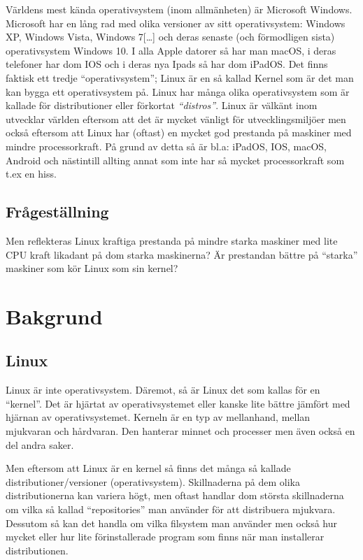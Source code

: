 \documentclass[12pt, a4paper]{report}
\begin{document}
   Världens mest kända operativsystem (inom allmänheten) är Microsoft Windows. Microsoft har en lång rad med olika versioner av sitt operativsystem\cite{windows}: Windows XP, Windows Vista, Windows 7[\dots] och deras senaste (och förmodligen sista) operativsystem Windows 10.
    I alla Apple datorer så har man macOS, i deras telefoner har dom IOS och i deras nya Ipads så har dom iPadOS.
    Det finns faktisk ett tredje ``operativsystem''; Linux är en så kallad Kernel \cite{redhat} som är det man kan bygga ett operativsystem på. Linux har många olika operativsystem som är kallade för distributioner eller förkortat \textit{``distros''}. Linux är välkänt inom utvecklar världen eftersom att det är mycket vänligt för utvecklingsmiljöer men också eftersom att Linux har (oftast) en mycket god prestanda på maskiner med mindre processorkraft. På grund av detta så är bl.a: iPadOS, IOS, macOS, Android och nästintill allting annat som inte har så mycket processorkraft som t.ex en hiss.
    
    \subsection{Frågeställning}
    Men reflekteras Linux kraftiga prestanda på mindre starka maskiner med lite CPU kraft likadant på dom starka maskinerna? Är prestandan bättre på ``starka'' maskiner som kör Linux som sin kernel?
 
 
\section{Bakgrund}

    \subsection{Linux}
 
   Linux är inte operativsystem. Däremot, så är Linux det som kallas för en ``kernel''\cite{redhat}. Det är hjärtat av operativsystemet eller kanske lite bättre jämfört med hjärnan av operativsystemet. Kerneln är en typ av mellanhand, mellan mjukvaran och hårdvaran. Den hanterar minnet och processer men även också en del andra saker.
 
   Men eftersom att Linux är en kernel så finns det många så kallade distributioner/versioner (operativsystem). Skillnaderna på dem olika distributionerna kan variera högt, men oftast handlar dom största skillnaderna om vilka så kallad ``repositories'' man använder för att distribuera mjukvara. Dessutom så kan det handla om vilka filsystem man använder men också hur mycket eller hur lite förinstallerade program som finns när man installerar distributionen.
\end{document}
